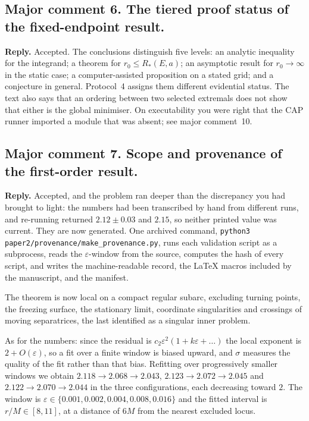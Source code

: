 \documentclass{article}
\begin{document}
\subsection{Major comment 6. The tiered proof status of the fixed-endpoint result.}
\textbf{Reply.} Accepted. The conclusions distinguish five levels: an analytic
inequality for the integrand; a theorem for \(r_0\leq R_*(E,a)\); an asymptotic
result for \(r_0 \to \infty\) in the static case; a computer-assisted proposition on
a stated grid; and a conjecture in general. Protocol~4 assigns them different
evidential status. The text also says that an ordering between two selected
extremals does not show that either is the global minimiser. On executability you
were right that the CAP runner imported a module that was absent; see major
comment~10.

\subsection{Major comment 7. Scope and provenance of the first-order result.}
\textbf{Reply.} Accepted, and the problem ran deeper than the discrepancy you had
brought to light: the numbers had been transcribed by hand from different runs, and
re-running returned \(2.12\pm0.03\) and \(2.15\), so neither printed value was
current. They are now generated. One archived command,
\texttt{python3 paper2/provenance/make\_provenance.py}, runs each validation script
as a subprocess, reads the \(\varepsilon\)-window from the source, computes the hash
of every script, and writes the machine-readable record, the \LaTeX{} macros
included by the manuscript, and the manifest.

The theorem is now local on a compact regular subarc, excluding turning points, the
freezing surface, the stationary limit, coordinate singularities and crossings of
moving separatrices, the last identified as a singular inner problem.

As for the numbers: since the residual is \(c_2\varepsilon^2(1+k\varepsilon + \dots)\)
the local exponent is \(2+O(\varepsilon)\), so a fit over a finite window is biased
upward, and \(\sigma\) measures the quality of the fit rather than that bias.
Refitting over progressively smaller windows we obtain
\(2.118\to2.068\to2.043\), \(2.123\to2.072\to2.045\) and \(2.122\to2.070\to2.044\)
in the three configurations, each decreasing toward \(2\). The window is
\(\varepsilon \in \{0.001,0.002,0.004,0.008,0.016\}\) and the fitted interval is
\(r/M \in [8,11]\), at a distance of \(6M\) from the nearest excluded locus.
\end{document}
